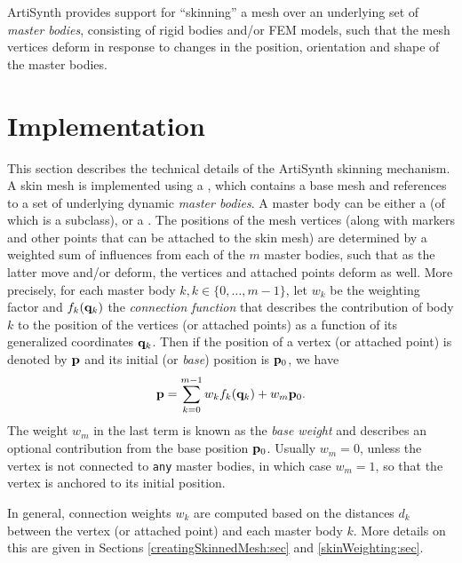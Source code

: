 ArtiSynth provides support for ``skinning'' a mesh over an underlying
set of {\it master bodies}, consisting of rigid bodies and/or FEM
models, such that the mesh vertices deform in response to changes in
the position, orientation and shape of the master bodies.

\section{Implementation}
\label{skinningImplementation:sec}

This section describes the technical details of the ArtiSynth skinning
mechanism. A skin mesh is implemented using a
, which contains a
base mesh and references to a set of underlying dynamic {\it master
bodies}.  A master body can be either a
 (of which
 is a subclass), or a
. The positions of the
mesh vertices (along with markers and other points that can be
attached to the skin mesh) are determined by a weighted sum of
influences from each of the $m$ master bodies, such that as the latter
move and/or deform, the vertices and attached points deform as
well. More precisely, for each master body
$k, k \in \{0, \ldots, m-1\}$, let $w_k$ be the weighting factor and
$f_k({\bf q}_k)$ the {\it connection function} that describes the
contribution of body $k$ to the position of the vertices (or attached
points) as a function of its generalized coordinates ${\bf q}_k$. Then if
the position of a vertex (or attached point) is denoted by ${\bf p}$ and
its initial (or {\it base}) position is ${\bf p}_0$, we have
%
\begin{equation}
{\bf p} = \sum_{k=0}^{m-1} w_k f_k ({\bf q}_k) + w_m {\bf p}_0.
\label{vertexpos:eqn}
\end{equation}
%
The weight $w_m$ in the last term is known as the {\it base weight}
and describes an optional contribution from the base position ${\bf p}_0$.
Usually $w_m = 0$, unless the vertex is not connected to {\tt any}
master bodies, in which case $w_m = 1$, so that the vertex is anchored
to its initial position.

In general, connection weights $w_k$ are computed based on the
distances $d_k$ between the vertex (or attached point) and
each master body $k$. More details on this are given in Sections
\ref{creatingSkinnedMesh:sec} and \ref{skinWeighting:sec}.

